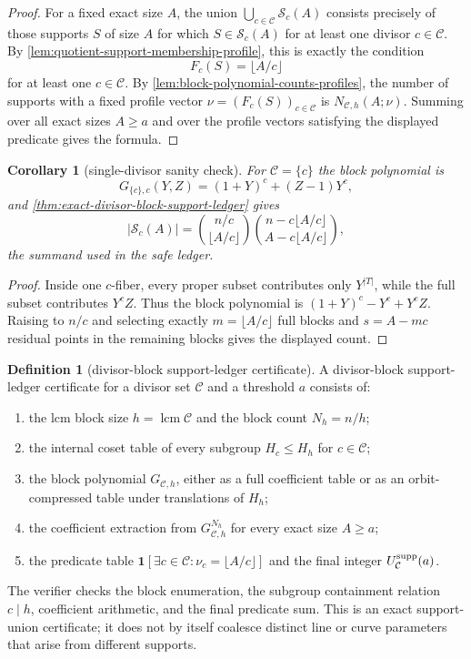 \documentclass[11pt]{article}
\newtheorem{corollary}[theorem]{Corollary}
\theoremstyle{definition}
\newtheorem{definition}[theorem]{Definition}
\theoremstyle{remark}
\begin{document}
\begin{proof}
For a fixed exact size $A$, the union
$\bigcup_{c\in\mathcal C}\mathcal S_c(A)$ consists precisely of those supports
$S$ of size $A$ for which $S\in\mathcal S_c(A)$ for at least one divisor
$c\in\mathcal C$.  By \cref{lem:quotient-support-membership-profile}, this is
exactly the condition
\[
        F_c(S)=\lfloor A/c\rfloor
\]
for at least one $c\in\mathcal C$.  By
\cref{lem:block-polynomial-counts-profiles}, the number of supports with a fixed
profile vector $\nu=(F_c(S))_{c\in\mathcal C}$ is
$N_{\mathcal C,h}(A;\nu)$.  Summing over all exact sizes $A\ge a$ and over the
profile vectors satisfying the displayed predicate gives the formula.
\end{proof}

\begin{corollary}[single-divisor sanity check]
\label{cor:single-divisor-support-ledger}
For $\mathcal C=\{c\}$ the block polynomial is
\[
        G_{\{c\},c}(Y,Z)=(1+Y)^c+(Z-1)Y^c,
\]
and \cref{thm:exact-divisor-block-support-ledger} gives
\[
        \left|\mathcal S_c(A)\right|
        =\binom{n/c}{\lfloor A/c\rfloor}
          \binom{n-c\lfloor A/c\rfloor}{A-c\lfloor A/c\rfloor},
\]
the summand used in the safe ledger.
\end{corollary}

\begin{proof}
Inside one $c$-fiber, every proper subset contributes only $Y^{|T|}$, while the
full subset contributes $Y^cZ$.  Thus the block polynomial is
$(1+Y)^c-Y^c+Y^cZ$.  Raising to $n/c$ and selecting exactly
$m=\lfloor A/c\rfloor$ full blocks and $s=A-mc$ residual points in the remaining
blocks gives the displayed count.
\end{proof}

\begin{definition}[divisor-block support-ledger certificate]
\label{def:divisor-block-support-ledger-certificate}
A divisor-block support-ledger certificate for a divisor set $\mathcal C$ and a
threshold $a$ consists of:
\begin{enumerate}[label=\textup{(\roman*)},leftmargin=2.2em]
\item the lcm block size $h=\operatorname{lcm}\mathcal C$ and the block count
$N_h=n/h$;
\item the internal coset table of every subgroup $H_c\le H_h$ for
$c\in\mathcal C$;
\item the block polynomial $G_{\mathcal C,h}$, either as a full coefficient table
or as an orbit-compressed table under translations of $H_h$;
\item the coefficient extraction from $G_{\mathcal C,h}^{N_h}$ for every exact
size $A\ge a$;
\item the predicate table
$\mathbf 1[\exists c\in\mathcal C:\nu_c=\lfloor A/c\rfloor]$ and the final
integer $U_{\mathcal C}^{\rm supp}(a)$.
\end{enumerate}
The verifier checks the block enumeration, the subgroup containment relation
$c\mid h$, coefficient arithmetic, and the final predicate sum.  This is an exact
support-union certificate; it does not by itself coalesce distinct line or curve
parameters that arise from different supports.
\end{definition}
\end{document}
